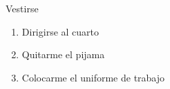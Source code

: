 
\item Vestirse
\begin{enumerate}
  \def\labelenumi{\arabic{enumi}.}
      \tightlist
\item
  Dirigirse al cuarto
\item
  Quitarme el pijama
\item
  Colocarme el uniforme de trabajo
  \end{enumerate}
